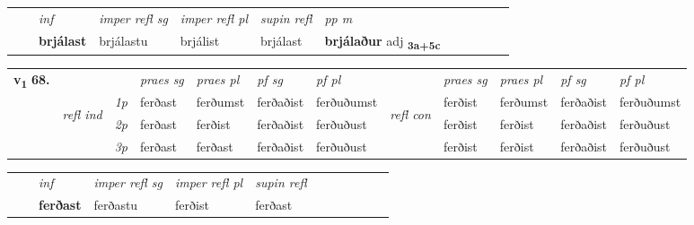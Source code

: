 \begin{tabular}{llllllllllll}
 & & \textit{inf}   & \textit{imper refl sg} & \textit{imper refl pl}   & \textit{supin refl} & \textit{pp m}     \\*
  & & \textbf{brjálast}    & brjálastu & brjálist   & brjálast & \textbf{brjálaður} adj \textbf{\textsubscript{3a+5c}} \\*
\cmidrule{1-12}
\end{tabular}



\begin{tabular}{llllllllllll} \toprule
\multirow{4}{*}{{{\textbf{v{\textsubscript{1}}} \Large{\textbf{68.}}}}}  & &   &  \textit{praes sg}  & \textit{praes pl}  &\textit{pf sg} & \textit{pf pl} &  &  \textit{praes sg}  & \textit{praes pl}  & \textit{pf sg} & \textit{pf pl } \\*
	\cmidrule{4-7} \cmidrule{9-12}
 &\multirow{3}{*}{\begin{turn}{90}\textit{refl ind}\end{turn}} & {\textit{1p}} & ferðast & ferðumst    & ferðaðist & ferðuðumst & \multirow{3}{*}{\begin{turn}{90}\textit{refl con}\end{turn}}  &ferðist & ferðumst & ferðaðist & ferðuðumst\\*
 &&  {\textit{2p}} &  ferðast  & ferðist   & ferðaðist & ferðuðust & &ferðist & ferðist & ferðaðist & ferðuðust \\*
& &  {\textit{3p}} & ferðast & ferðast   & ferðaðist & ferðuðust & & ferðist & ferðist& ferðaðist & ferðuðust  \\*
\cmidrule{4-7} \cmidrule{9-12}
\end{tabular}


\begin{tabular}{llllllllllll}
 & & \textit{inf}   & \textit{imper refl sg} & \textit{imper refl pl}   & \textit{supin refl}      \\*
  & & \textbf{ferðast}    & ferðastu & ferðist   & ferðast  \\*
\cmidrule{1-12}
\end{tabular}



